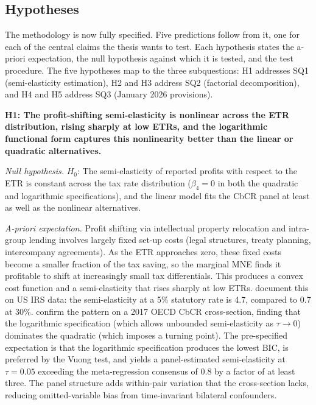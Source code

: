\documentclass[11pt,a4paper]{article}
\begin{document}
\subsection{Hypotheses}\label{sec:hypotheses}

The methodology is now fully specified. Five predictions follow from it, one for each of the central claims the thesis wants to test. Each hypothesis states the a-priori expectation, the null hypothesis against which it is tested, and the test procedure. The five hypotheses map to the three subquestions: H1 addresses SQ1 (semi-elasticity estimation), H2 and H3 address SQ2 (factorial decomposition), and H4 and H5 address SQ3 (January 2026 provisions).

\textbf{H1: The profit-shifting semi-elasticity is nonlinear across the ETR distribution, rising sharply at low ETRs, and the logarithmic functional form captures this nonlinearity better than the linear or quadratic alternatives.}

\textit{Null hypothesis.} $H_0$: The semi-elasticity of reported profits with respect to the ETR is constant across the tax rate distribution ($\beta_4 = 0$ in both the quadratic and logarithmic specifications), and the linear model fits the CbCR panel at least as well as the nonlinear alternatives.

\textit{A-priori expectation.} Profit shifting via intellectual property relocation and intra-group lending involves largely fixed set-up costs (legal structures, treaty planning, intercompany agreements). As the ETR approaches zero, these fixed costs become a smaller fraction of the tax saving, so the marginal MNE finds it profitable to shift at increasingly small tax differentials. This produces a convex cost function and a semi-elasticity that rises sharply at low ETRs. \citet{dowd2017} document this on US IRS data: the semi-elasticity at a 5\% statutory rate is 4.7, compared to 0.7 at 30\%. \citet{garcia-bernardo2024} confirm the pattern on a 2017 OECD CbCR cross-section, finding that the logarithmic specification (which allows unbounded semi-elasticity as $\tau \to 0$) dominates the quadratic (which imposes a turning point). The pre-specified expectation is that the logarithmic specification produces the lowest BIC, is preferred by the Vuong test, and yields a panel-estimated semi-elasticity at $\tau = 0.05$ exceeding the meta-regression consensus of 0.8 \citep{heckemeyer2017} by a factor of at least three. The panel structure adds within-pair variation that the cross-section lacks, reducing omitted-variable bias from time-invariant bilateral confounders.
\end{document}
